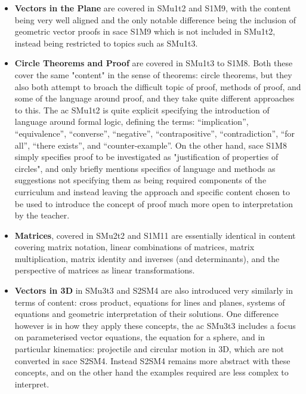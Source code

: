 \documentclass[twoside,12pt,a4paper]{report}
\begin{document}
\begin{itemize}
	\item \textbf{Vectors in the Plane} are covered in SMu1t2 and S1M9, with the content being very well aligned and the only notable difference being the inclusion of geometric vector proofs in \gls{sace} S1M9 which is not included in SMu1t2, instead being restricted to topics such as SMu1t3.
	\item \textbf{Circle Theorems and Proof} are covered in SMu1t3 to S1M8. Both these cover the same "content" in the sense of theorems: circle theorems, but they also both attempt to broach the difficult topic of proof, methods of proof, and some of the language around proof, and they take quite different approaches to this. The \gls{ac} SMu1t2 is quite explicit specifying the introduction of language around formal logic, defining the terms: ``implication'', ``equivalence'', ``converse'', ``negative'', ``contrapositive'', ``contradiction'', ``for all'', ``there exists'', and ``counter-example''. On the other hand, \gls{sace} S1M8 simply specifies proof to be investigated as "justification of properties of circles", and only briefly mentions specifics of language and methods as suggestions not specifying them as being required components of the curriculum and instead leaving the approach and specific content chosen to be used to introduce the concept of proof much more open to interpretation by the teacher.
	\item \textbf{Matrices}, covered in SMu2t2 and S1M11 are essentially identical in content covering matrix notation, linear combinations of matrices, matrix multiplication, matrix identity and inverses (and determinants), and the perspective of matrices as linear transformations. 
	\item \textbf{Vectors in 3D} in SMu3t3 and S2SM4 are also introduced very similarly in terms of content: cross product, equations for lines and planes, systems of equations and geometric interpretation of their solutions.  One difference however is in how they apply these concepts, the \gls{ac} SMu3t3 includes a focus on parameterised vector equations, the equation for a sphere, and in particular kinematics: projectile and circular motion in 3D, which are not converted in \gls{sace} S2SM4. Instead S2SM4 remains more abstract with these concepts, and on the other hand the examples required are less complex to interpret. 
\end{itemize}
\end{document}
